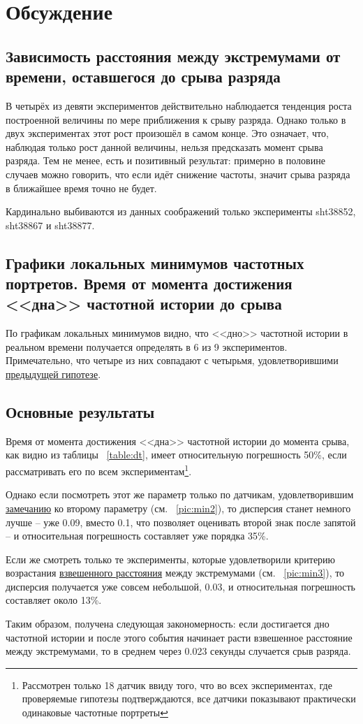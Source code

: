 \section{Обсуждение}\label{discuss}
\subsection{Зависимость расстояния между экстремумами от времени, оставшегося до срыва разряда}

В четырёх из девяти экспериментов действительно наблюдается тенденция роста построенной величины по мере приближения к срыву разряда. Однако только в двух экспериментах этот рост произошёл в самом конце. Это означает, что, наблюдая только рост данной величины, нельзя предсказать момент срыва разряда. Тем не менее, есть и позитивный результат: примерно в половине случаев можно говорить, что если идёт снижение частоты, значит срыва разряда в ближайшее время точно не будет.

Кардинально выбиваются из данных соображений только эксперименты sht38852, sht38867 и sht38877.

\subsection{Графики локальных минимумов частотных портретов. Время от момента достижения <<дна>> частотной истории до срыва}

По графикам локальных минимумов видно, что <<дно>> частотной истории в реальном времени получается определять в 6 из 9 экспериментов. Примечательно, что четыре из них совпадают с четырьмя, удовлетворившими \hyperref[analysis]{предыдущей гипотезе}.

\subsection{Основные результаты}

Время от момента достижения <<дна>> частотной истории до момента срыва, как видно из таблицы ~\ref{table:dt}, имеет относительную погрешность 50\%, если рассматривать его по всем экспериментам\footnote{Рассмотрен только 18 датчик ввиду того, что во всех экспериментах, где проверяемые гипотезы подтверждаются, все датчики показывают практически одинаковые частотные портреты}.

Однако если посмотреть этот же параметр только по датчикам, удовлетворившим \hyperref[globalMin]{замечанию} ко второму параметру (см. ~\ref{pic:min2}), то дисперсия станет немного лучше -- уже 0.09, вместо 0.1, что позволяет оценивать второй знак после запятой -- и относительная погрешность составляет уже порядка 35\%. 

Если же смотреть только те эксперименты, которые удовлетворили критерию возрастания \hyperref[eq:wDist]{взвешенного расстояния} между экстремумами (см. ~\ref{pic:min3}), то дисперсия получается уже совсем небольшой, 0.03, и относительная погрешность составляет около 13\%.

Таким образом, получена следующая закономерность: если достигается дно частотной истории и после этого события начинает расти взвешенное расстояние между экстремумами, то в среднем через 0.023 секунды случается срыв разряда.